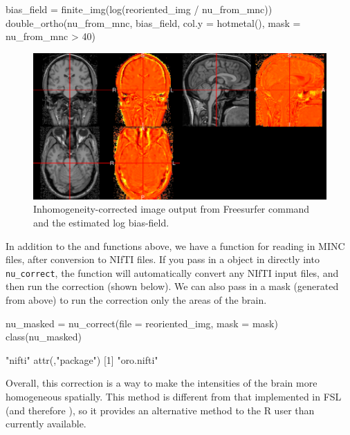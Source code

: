 \begin{Schunk}
\begin{Sinput}
bias_field = finite_img(log(reoriented_img / nu_from_mnc))
double_ortho(nu_from_mnc, bias_field, col.y = hotmetal(), mask = nu_from_mnc > 40)
\end{Sinput}
\begin{figure}
\includegraphics{Freesurfer_files/figure-latex/nu_correct_plot-1} \caption[Inhomogeneity-corrected image output from Freesurfer  command and the estimated log bias-field]{Inhomogeneity-corrected image output from Freesurfer  command and the estimated log bias-field.}\label{fig:nu_correct_plot}
\end{figure}
\end{Schunk}

In addition to the  and  functions above, we
have a  function for reading in MINC files, after
conversion to NIfTI files. If you pass in a  object in
directly into \texttt{nu\_correct}, the function will automatically
convert any NIfTI input files, and then run the correction (shown
below). We can also pass in a mask (generated from above) to run the
correction only the areas of the brain.

\begin{Schunk}
\begin{Sinput}
nu_masked = nu_correct(file = reoriented_img, mask = mask)
class(nu_masked)
\end{Sinput}
\begin{Soutput}
[1] "nifti"
attr(,"package")
[1] "oro.nifti"
\end{Soutput}
\end{Schunk}

Overall, this correction is a way to make the intensities of the brain
more homogeneous spatially. This method is different from that
implemented in FSL (and therefore ), so it provides an
alternative method to the R user than currently available.

